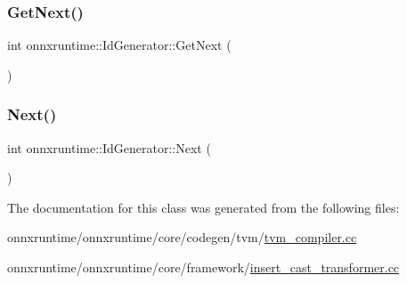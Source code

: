 \subsubsection{\texorpdfstring{Get\+Next()}{GetNext()}}
{\footnotesize\ttfamily int onnxruntime\+::\+Id\+Generator\+::\+Get\+Next (\begin{DoxyParamCaption}{ }\end{DoxyParamCaption})\hspace{0.3cm}{\ttfamily [inline]}}

\mbox{\label{classonnxruntime_1_1IdGenerator_ae63c5ab71bee8896bf5ebcac6dbfb08a}} 
\subsubsection{\texorpdfstring{Next()}{Next()}}
{\footnotesize\ttfamily int onnxruntime\+::\+Id\+Generator\+::\+Next (\begin{DoxyParamCaption}{ }\end{DoxyParamCaption})\hspace{0.3cm}{\ttfamily [inline]}}



The documentation for this class was generated from the following files\+:\begin{DoxyCompactItemize}
\item 
onnxruntime/onnxruntime/core/codegen/tvm/\mbox{\hyperlink{tvm__compiler_8cc}{tvm\+\_\+compiler.\+cc}}\item 
onnxruntime/onnxruntime/core/framework/\mbox{\hyperlink{insert__cast__transformer_8cc}{insert\+\_\+cast\+\_\+transformer.\+cc}}\end{DoxyCompactItemize}

